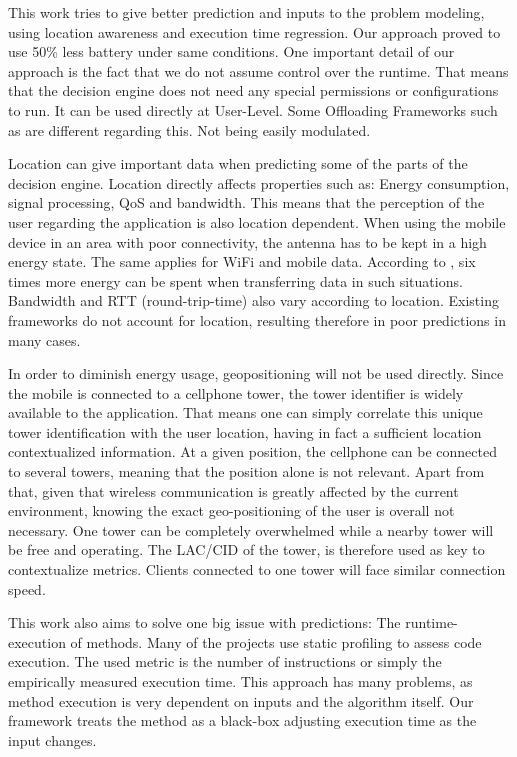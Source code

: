 \documentclass[10pt, conference, letterpaper]{IEEEtran}
\begin{document}
  This work tries to give better prediction and inputs to the problem modeling, using location awareness and execution time regression. Our approach proved to use 50\% less battery under same conditions. One important detail of our approach is the fact that we do not assume control over the runtime. That means that the decision engine does not need any special permissions or configurations to run. It can be used directly at User-Level. Some Offloading Frameworks such as \cite{Chun:2011:CEE:1966445.1966473} are different regarding this. Not being easily modulated.
  
  Location can give important data when predicting some of the parts of the decision engine. Location directly affects properties such as: Energy consumption, signal processing, QoS and bandwidth. This means that the perception of the user regarding the application is also location dependent. When using the mobile device in an area with poor connectivity, the antenna has to be kept in a high energy state. The same applies for WiFi and mobile data. According to \cite{Schulman10bartendr:a}, six times more energy can be spent when transferring data in such situations. Bandwidth and RTT (round-trip-time) also vary according to location. Existing frameworks do not account for location, resulting therefore in poor predictions in many cases.
  
  In order to diminish energy usage, geopositioning will not be used directly. Since the mobile is connected to a cellphone tower, the tower identifier is widely available to the application. That means one can simply correlate this unique tower identification with the user location, having in fact a sufficient location contextualized information. At a given position, the cellphone can be connected to several towers, meaning that the position alone is not relevant. Apart from that, given that wireless communication is greatly affected by the current environment, knowing the exact geo-positioning of the user is overall not necessary. One tower can be completely overwhelmed while a nearby tower will be free and operating. The LAC/CID of the tower, is therefore used as key to contextualize metrics. Clients connected to one tower will face similar connection speed.

  This work also aims to solve one big issue with predictions: The runtime-execution of methods. Many of the projects use static profiling to assess code execution. The used metric is the number of instructions or simply the empirically measured execution time. This approach has many problems, as method execution is very dependent on inputs and the algorithm itself. Our framework treats the method as a black-box adjusting execution time as the input changes.
\end{document}
